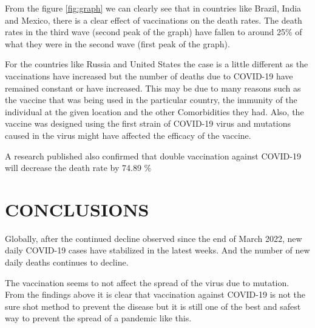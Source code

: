 \documentclass[11pt,a4paper,]{article}
\begin{document}
From the figure \ref{fig:graph} we can clearly see that in countries like Brazil, India and Mexico, there is a clear effect of vaccinations on the death rates. The death rates in the third wave (second peak of the graph) have fallen to around 25\% of what they were in the second wave (first peak of the graph).

\clearpage

For the countries like Russia and United States the case is a little different as the vaccinations have increased but the number of deaths due to COVID-19 have remained constant or have increased. This may be due to many reasons such as the vaccine that was being used in the particular country, the immunity of the individual at the given location and the other Comorbidities they had. Also, the vaccine was designed using the first strain of COVID-19 virus and mutations caused in the virus might have affected the efficacy of the vaccine.

A research published \textcite{paper} also confirmed that double vaccination against COVID-19 will decrease the death rate by 74.89 \%

\hypertarget{conclusions}{%
\section{\texorpdfstring{\textbf{CONCLUSIONS}}{CONCLUSIONS}}\label{conclusions}}

Globally, after the continued decline observed since the end of March 2022, new daily COVID-19 cases have stabilized in the latest weeks. And the number of new daily deaths continues to decline.

The vaccination seems to not affect the spread of the virus due to mutation.
From the findings above it is clear that vaccination against COVID-19 is not the sure shot method to prevent the disease but it is still one of the best and safest way to prevent the spread of a pandemic like this.

\clearpage

\printbibliography
\end{document}
